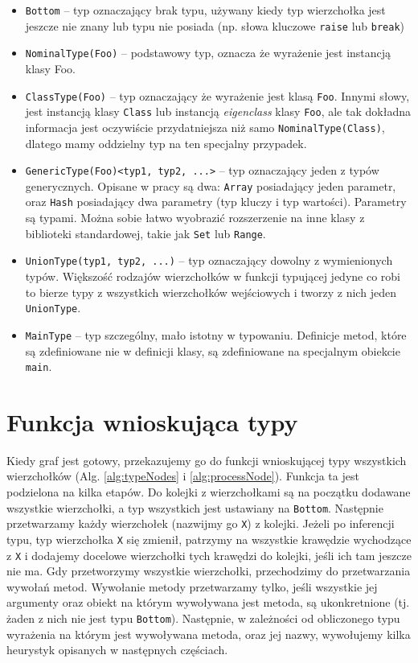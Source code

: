 \documentclass[shortabstract,mgr]{iithesis}
\begin{document}
\begin{itemize}
 \item \texttt{Bottom} -- typ oznaczający brak typu, używany kiedy typ wierzchołka jest jeszcze nie znany lub typu nie posiada (np. słowa kluczowe \texttt{raise} lub \texttt{break})
 \item \texttt{NominalType(Foo)} -- podstawowy typ, oznacza że wyrażenie jest instancją klasy Foo.
 \item \texttt{ClassType(Foo)} -- typ oznaczający że wyrażenie jest klasą \texttt{Foo}. Innymi słowy, jest instancją klasy \texttt{Class} lub instancją \textit{eigenclass} klasy \texttt{Foo}, ale tak dokładna informacja jest oczywiście przydatniejsza niż samo \texttt{NominalType(Class)}, dlatego mamy oddzielny typ na ten specjalny przypadek.
 \item \texttt{GenericType(Foo)<typ1, typ2, ...>} -- typ oznaczający jeden z typów generycznych. Opisane w pracy są dwa: \texttt{Array} posiadający jeden parametr, oraz \texttt{Hash} posiadający dwa parametry (typ kluczy i typ wartości). Parametry są typami. Można sobie łatwo wyobrazić rozszerzenie na inne klasy z biblioteki standardowej, takie jak \texttt{Set} lub \texttt{Range}.
 \item \texttt{UnionType(typ1, typ2, ...)} -- typ oznaczający dowolny z wymienionych typów. Większość rodzajów wierzchołków w funkcji typującej jedyne co robi to bierze typy z wszystkich wierzchołków wejściowych i tworzy z nich jeden \texttt{UnionType}.
 \item \texttt{MainType} -- typ szczególny, mało istotny w typowaniu. Definicje metod, które są zdefiniowane nie w definicji klasy, są zdefiniowane na specjalnym obiekcie \texttt{main}.
\end{itemize}



\section{Funkcja wnioskująca typy}

Kiedy graf jest gotowy, przekazujemy go do funkcji wnioskującej typy wszystkich wierzchołków (Alg. \ref{alg:typeNodes} i \ref{alg:processNode}). Funkcja ta jest podzielona na kilka etapów.
Do kolejki z wierzchołkami są na początku dodawane wszystkie wierzchołki, a typ wszystkich jest ustawiany na \texttt{Bottom}.
Następnie przetwarzamy każdy wierzchołek (nazwijmy go \texttt{X}) z kolejki.
Jeżeli po inferencji typu, typ wierzchołka \texttt{X} się zmienił, patrzymy na wszystkie krawędzie wychodzące z \texttt{X} i dodajemy docelowe wierzchołki tych krawędzi do kolejki, jeśli ich tam jeszcze nie ma.
Gdy przetworzymy wszystkie wierzchołki, przechodzimy do przetwarzania wywołań metod.
Wywołanie metody przetwarzamy tylko, jeśli wszystkie jej argumenty oraz obiekt na którym wywoływana jest metoda, są ukonkretnione (tj. żaden z nich nie jest typu \texttt{Bottom}).
Następnie, w zależności od obliczonego typu wyrażenia na którym jest wywoływana metoda, oraz jej nazwy, wywołujemy kilka heurystyk opisanych w następnych częściach.
\end{document}
